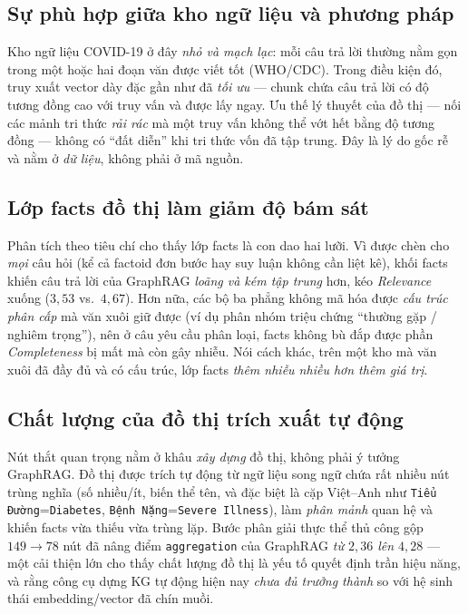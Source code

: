\documentclass[conference]{IEEEtran}
\begin{document}
\subsection{Sự phù hợp giữa kho ngữ liệu và phương pháp}
Kho ngữ liệu COVID-19 ở đây \emph{nhỏ và mạch lạc}: mỗi câu trả lời thường nằm gọn trong một hoặc hai đoạn văn được viết tốt (WHO/CDC). Trong điều kiện đó, truy xuất vector dày đặc gần như đã \emph{tối ưu} --- chunk chứa câu trả lời có độ tương đồng cao với truy vấn và được lấy ngay. Ưu thế lý thuyết của đồ thị --- nối các mảnh tri thức \emph{rải rác} mà một truy vấn không thể vớt hết bằng độ tương đồng --- không có ``đất diễn'' khi tri thức vốn đã tập trung. Đây là lý do gốc rễ và nằm ở \emph{dữ liệu}, không phải ở mã nguồn.

\subsection{Lớp facts đồ thị làm giảm độ bám sát}
Phân tích theo tiêu chí cho thấy lớp facts là con dao hai lưỡi. Vì được chèn cho \emph{mọi} câu hỏi (kể cả factoid đơn bước hay suy luận không cần liệt kê), khối facts khiến câu trả lời của GraphRAG \emph{loãng và kém tập trung} hơn, kéo \emph{Relevance} xuống ($3{,}53$ vs.\ $4{,}67$). Hơn nữa, các bộ ba phẳng không mã hóa được \emph{cấu trúc phân cấp} mà văn xuôi giữ được (ví dụ phân nhóm triệu chứng ``thường gặp / nghiêm trọng''), nên ở câu yêu cầu phân loại, facts không bù đắp được phần \emph{Completeness} bị mất mà còn gây nhiễu. Nói cách khác, trên một kho mà văn xuôi đã đầy đủ và có cấu trúc, lớp facts \emph{thêm nhiễu nhiều hơn thêm giá trị}.

\subsection{Chất lượng của đồ thị trích xuất tự động}
Nút thắt quan trọng nằm ở khâu \emph{xây dựng} đồ thị, không phải ý tưởng GraphRAG. Đồ thị được trích tự động từ ngữ liệu song ngữ chứa rất nhiều nút trùng nghĩa (số nhiều/ít, biến thể tên, và đặc biệt là cặp Việt--Anh như \texttt{Tiểu Đường}=\texttt{Diabetes}, \texttt{Bệnh Nặng}=\texttt{Severe Illness}), làm \emph{phân mảnh} quan hệ và khiến facts vừa thiếu vừa trùng lặp. Bước phân giải thực thể thủ công gộp $149\rightarrow 78$ nút đã nâng điểm \texttt{aggregation} của GraphRAG \emph{từ $2{,}36$ lên $4{,}28$} --- một cải thiện lớn cho thấy chất lượng đồ thị là yếu tố quyết định trần hiệu năng, và rằng công cụ dựng KG tự động hiện nay \emph{chưa đủ trưởng thành} so với hệ sinh thái embedding/vector đã chín muồi.
\end{document}
